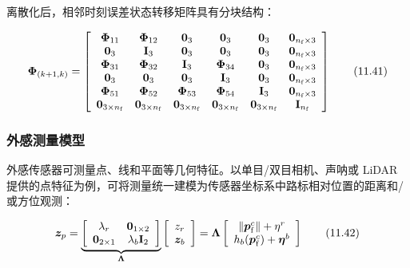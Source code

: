 离散化后，相邻时刻误差状态转移矩阵具有分块结构：

\begin{equation}
\boldsymbol {\Phi} _ {(k + 1, k)} = \left[ \begin{array}{c c c c c c} \boldsymbol {\Phi} _ {1 1} & \boldsymbol {\Phi} _ {1 2} & \mathbf {0} _ {3} & \mathbf {0} _ {3} & \mathbf {0} _ {3} & \mathbf {0} _ {n _ {\mathrm{f}} \times 3} \\ \mathbf {0} _ {3} & \mathbf {I} _ {3} & \mathbf {0} _ {3} & \mathbf {0} _ {3} & \mathbf {0} _ {3} & \mathbf {0} _ {n _ {\mathrm{f}} \times 3} \\ \boldsymbol {\Phi} _ {3 1} & \boldsymbol {\Phi} _ {3 2} & \mathbf {I} _ {3} & \boldsymbol {\Phi} _ {3 4} & \mathbf {0} _ {3} & \mathbf {0} _ {n _ {\mathrm{f}} \times 3} \\ \mathbf {0} _ {3} & \mathbf {0} _ {3} & \mathbf {0} _ {3} & \mathbf {I} _ {3} & \mathbf {0} _ {3} & \mathbf {0} _ {n _ {\mathrm{f}} \times 3} \\ \boldsymbol {\Phi} _ {5 1} & \boldsymbol {\Phi} _ {5 2} & \boldsymbol {\Phi} _ {5 3} & \boldsymbol {\Phi} _ {5 4} & \mathbf {I} _ {3} & \mathbf {0} _ {n _ {\mathrm{f}} \times 3} \\ \mathbf {0} _ {3 \times n _ {\mathrm{f}}} & \mathbf {0} _ {3 \times n _ {\mathrm{f}}} & \mathbf {0} _ {3 \times n _ {\mathrm{f}}} & \mathbf {0} _ {3 \times n _ {\mathrm{f}}} & \mathbf {0} _ {3 \times n _ {\mathrm{f}}} & \mathbf {I} _ {n _ {\mathrm{f}}} \end{array} \right]\tag{11.41}
\end{equation}

\subsubsection{外感测量模型}

外感传感器可测量点、线和平面等几何特征。以单目/双目相机、声呐或 LiDAR 提供的点特征为例，可将测量统一建模为传感器坐标系中路标相对位置的距离和/或方位观测：

\begin{equation}
\boldsymbol {z} _ {p} = \underbrace {\left[ \begin{array}{c c} \lambda_ {r} & \mathbf {0} _ {1 \times 2} \\ \mathbf {0} _ {2 \times 1} & \lambda_ {b} \mathbf {I} _ {2} \end{array} \right]} _ {\boldsymbol {\Lambda}} \left[ \begin{array}{c} z _ {r} \\ \boldsymbol {z} _ {b} \end{array} \right] = \boldsymbol {\Lambda} \left[ \begin{array}{c} \| \boldsymbol {p} _ {\mathrm{f}} ^ {c} \| + \eta^ {r} \\ h _ {b} (\boldsymbol {p} _ {\mathrm{f}} ^ {c}) + \boldsymbol {\eta} ^ {b} \end{array} \right]\tag{11.42}
\end{equation}

